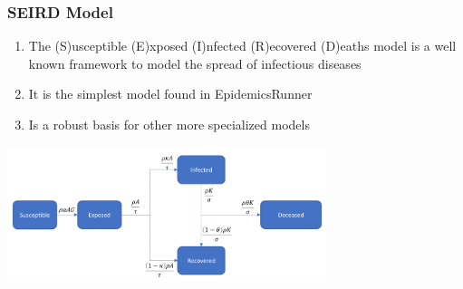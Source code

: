 \documentclass{beamer}
\begin{document}
\begin{frame}
	\frametitle{SEIRD Model}
	\begin{enumerate}[$\bullet$]
		\item The (S)usceptible (E)xposed (I)nfected (R)ecovered (D)eaths model is a well known framework to model the spread of infectious diseases		
		\item It is the simplest model found in EpidemicsRunner \\\vspace{0.1cm}
	       	
                \item Is a robust basis for other more specialized models	\\\vspace{0.3cm}

	\end{enumerate}
	\begin{center}
		\includegraphics[width=0.7\textwidth]{./images/SEIRD_flow.png}
	\end{center}
\end{frame}

 			


\end{document}
